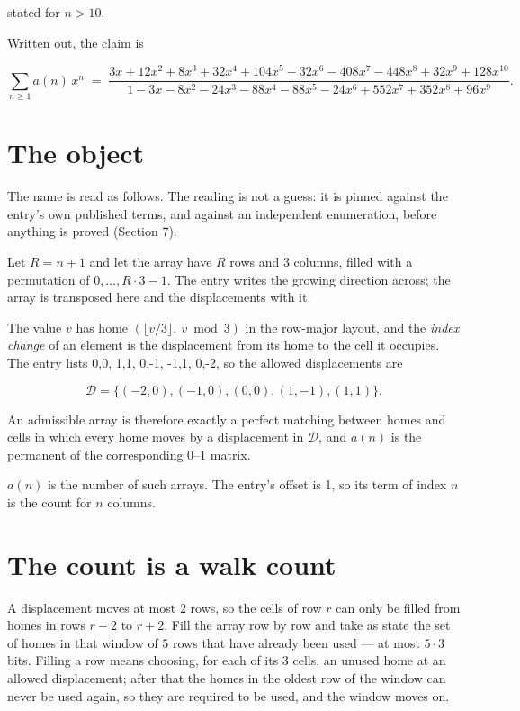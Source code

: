 \documentclass[11pt]{article}
\theoremstyle{definition}
\begin{document}
stated for $n > 10$.

Written out, the claim is

\[\sum_{n \ge 1} a(n)\,x^n \;=\; \frac{3x + 12x^{2} + 8x^{3} + 32x^{4} + 104x^{5} - 32x^{6} - 408x^{7} - 448x^{8} + 32x^{9} + 128x^{10}}{1 - 3x - 8x^{2} - 24x^{3} - 88x^{4} - 88x^{5} - 24x^{6} + 552x^{7} + 352x^{8} + 96x^{9}}.\]

\section{The object}

The name is read as follows. The reading is not a guess: it is pinned against the entry's own published terms, and against an independent enumeration, before anything is proved (Section 7).

Let $R = n + 1$ and let the array have $R$ rows and $3$ columns, filled with a permutation of $0,\dots,R\cdot3-1$. The entry writes the growing direction across; the array is transposed here and the displacements with it.

The value $v$ has home $(\lfloor v/3\rfloor,\ v \bmod 3)$ in the row-major layout, and the {\itshape index change} of an element is the displacement from its home to the cell it occupies. The entry lists 0,0, 1,1, 0,-1, -1,1, 0,-2, so the allowed displacements are

\[\mathcal{D} = \{(-2,0), (-1,0), (0,0), (1,-1), (1,1)\}.\]

An admissible array is therefore exactly a perfect matching between homes and cells in which every home moves by a displacement in $\mathcal{D}$, and $a(n)$ is the permanent of the corresponding $0$--$1$ matrix.

$a(n)$ is the number of such arrays. The entry's offset is 1, so its term of index $n$ is the count for $n$ columns.

\section{The count is a walk count}

A displacement moves at most $2$ rows, so the cells of row $r$ can only be filled from homes in rows $r-2$ to $r+2$. Fill the array row by row and take as state the set of homes in that window of $5$ rows that have already been used --- at most $5\cdot3$ bits. Filling a row means choosing, for each of its $3$ cells, an unused home at an allowed displacement; after that the homes in the oldest row of the window can never be used again, so they are required to be used, and the window moves on.
\end{document}
